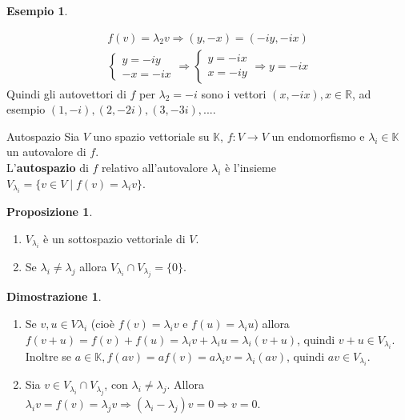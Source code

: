\documentclass[a4paper]{article}
\theoremstyle{definition}
\newtheorem*{dimm}{Dimostrazione}
\newtheorem*{es}{Esempio}
\newtheorem*{prop}{Proposizione}
\begin{document}
\begin{es}
\begin{itemize}
\begin{align*}
					f(v) = \lambda_2 v \Rightarrow (y, -x) = (-iy, -ix) \\
					\begin{cases}
						y = - iy \\
						- x = - ix
					\end{cases} \Rightarrow \begin{cases}
						y = - ix \\
						x = - iy
					\end{cases} \Rightarrow y = - ix
				\end{align*}
				Quindi gli autovettori di $f$ per $\lambda_2 = -i$ sono i vettori $(x, -ix), x \in \mathbb{R}$, ad esempio $(1, -i), (2, -2i), (3, -3i), ...$.
		\end{itemize}
	\end{es}

	\begin{deff}{Autospazio}{}
		Sia $V$ uno spazio vettoriale su $\mathbb{K}$, $f: V \to V$ un endomorfismo e $\lambda_i \in \mathbb{K}$ un autovalore di $f$. \\
		L'\textbf{autospazio} di $f$ relativo all'autovalore $\lambda_i$ è l'insieme $V_{\lambda_i} = \{v \in V \mid f(v) = \lambda_i v\}$.
	\end{deff}
	\begin{prop}
		\begin{enumerate}
			\item $V_{\lambda_i}$ è un sottospazio vettoriale di $V$.
			\item Se $\lambda_i \ne \lambda_j$ allora $V_{\lambda_i} \cap V_{\lambda_j} = \{0\}$.
		\end{enumerate}
	\end{prop}
	\begin{dimm}
		\begin{enumerate}
			\item Se $v, u \in V\lambda_i$ (cioè $f(v) = \lambda_i v$ e $f(u) = \lambda_i u$) allora $f(v + u) = f(v) + f(u) = \lambda_i v + \lambda_i u = \lambda_i(v + u)$,
				quindi $v + u \in V_{\lambda_i}$.
				Inoltre se $a \in \mathbb{K}, f(av) = af(v) = a\lambda_i v = \lambda_i (av)$, quindi $av \in V_{\lambda_i}$.
			\item Sia $v \in V_{\lambda_i} \cap V_{\lambda_j}$, con $\lambda_i \ne \lambda_j$.
				Allora $\lambda_i v = f(v) = \lambda_j v \Rightarrow (\lambda_i - \lambda_j)v = 0 \Rightarrow v = 0$.
		\end{enumerate}
	\end{dimm}
\end{document}
